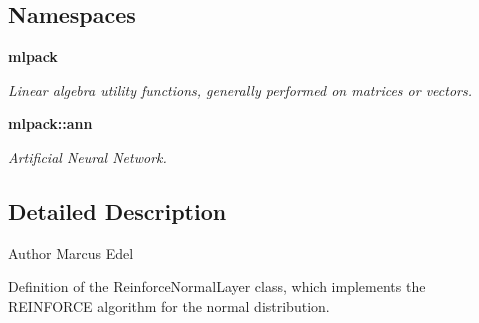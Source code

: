 \subsection*{Namespaces}
\begin{DoxyCompactItemize}
\item 
 {\bf mlpack}
\begin{DoxyCompactList}\small\item\em Linear algebra utility functions, generally performed on matrices or vectors. \end{DoxyCompactList}\item 
 {\bf mlpack\+::ann}
\begin{DoxyCompactList}\small\item\em Artificial Neural Network. \end{DoxyCompactList}\end{DoxyCompactItemize}


\subsection{Detailed Description}
\begin{DoxyAuthor}{Author}
Marcus Edel
\end{DoxyAuthor}
Definition of the Reinforce\+Normal\+Layer class, which implements the R\+E\+I\+N\+F\+O\+R\+CE algorithm for the normal distribution. 